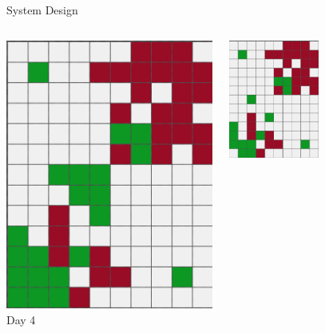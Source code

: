 \documentclass[9pt]{beamer}
\begin{document}
\begin{frame}{System Design}
\begin{columns}
\begin{column}{0.33\textwidth}
\begin{columns}
\begin{column}{0.5\textwidth}
\begin{center}
                        \includegraphics[width=\textwidth,trim={0cm 0cm 0cm 0cm},clip]{img/analyst4.png} 
                        \newline
                        Day 4
                    \end{center}
                \end{column}
            \end{columns}
        \end{column}
        \begin{column}{0.33\textwidth}
            \begin{center}
                \includegraphics[width=0.50\textwidth,trim={0cm 0cm 0cm 0cm},clip]{img/analyst5.png}

\end{center}
\end{column}
\end{columns}
\end{frame}
\end{document}
